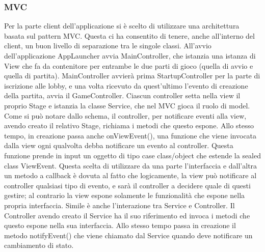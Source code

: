 \subsubsection{MVC}
Per la parte client dell’applicazione si è scelto di utilizzare una architettura basata sul pattern MVC\@.
Questa ci ha consentito di tenere, anche all’interno del client, un buon livello di separazione tra le singole classi.
\newline
All’avvio dell’applicazione AppLauncher avvia MainController, che istanzia una istanza di View che fa da contenitore per entrambe le due parti di gioco (quella di avvio e quella di partita).
MainController avvierà prima StartupController per la parte di iscrizione alle lobby, e una volta ricevuto da quest’ultimo l'evento di creazione della partita, avvia il GameController.
Ciascun controller setta nella view il proprio Stage e istanzia la classe Service, che nel MVC gioca il ruolo di model.
Come si può notare dallo schema, il controller, per notificare eventi alla view, avendo creato il relativo Stage, richiama i metodi che questo espone.
\newline
Allo stesso tempo, in creazione passa anche onViewEvent(), una funzione che viene invocata dalla view ogni qualvolta debba notificare un evento al controller.
Questa funzione prende in input un oggetto di tipo case class/object che estende la sealed class ViewEvent.
Questa scelta di utilizzare da una parte l’interfaccia e dall’altra un metodo a callback è dovuta al fatto che logicamente, la view può notificare al controller qualsiasi tipo di evento, e sarà il controller a decidere quale di questi gestire;
al contrario la view espone solamente le funzionalità che espone nella propria interfaccia.
\newline
Simile è anche l’interazione tra Service e Controller.
Il Controller avendo creato il Service ha il suo riferimento ed invoca i metodi che questo espone nella sua interfaccia.
Allo stesso tempo passa in creazione il metodo notifyEvent() che viene chiamato dal Service quando deve notificare un cambiamento di stato.

